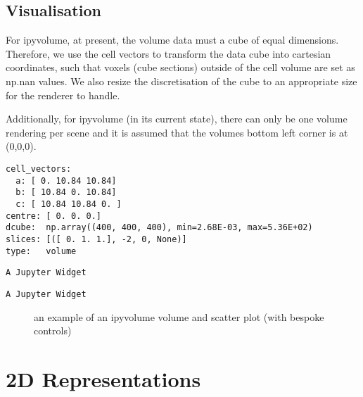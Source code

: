 \documentclass[10pt,parskip=half,
	toc=sectionentrywithdots,
	bibliography=totocnumbered,
	captions=tableheading,numbers=noendperiod]{scrartcl}
\begin{document}
\subsection{Visualisation}\label{visualisation}

For ipyvolume, at present, the volume data must a cube of equal
dimensions. Therefore, we use the cell vectors to transform the data
cube into cartesian coordinates, such that voxels (cube sections)
outside of the cell volume are set as np.nan values. We also resize the
discretisation of the cube to an appropriate size for the renderer to
handle.

Additionally, for ipyvolume (in its current state), there can only be
one volume rendering per scene and it is assumed that the volumes bottom
left corner is at (0,0,0).

\begin{lstlisting}[language={},postbreak={},numbers=none,xrightmargin=7pt,belowskip=5pt,aboveskip=5pt,breakindent=0pt]
cell_vectors: 
  a: [ 0. 10.84 10.84]
  b: [ 10.84 0. 10.84]
  c: [ 10.84 10.84 0. ]
centre: [ 0. 0. 0.]
dcube:  np.array((400, 400, 400), min=2.68E-03, max=5.36E+02)
slices: [([ 0. 1. 1.], -2, 0, None)]
type:   volume

\end{lstlisting}

\begin{lstlisting}[language={},postbreak={},numbers=none,xrightmargin=7pt,breakindent=0pt,aboveskip=5pt,belowskip=5pt]
A Jupyter Widget
\end{lstlisting}

\begin{lstlisting}[language={},postbreak={},numbers=none,xrightmargin=7pt,breakindent=0pt,aboveskip=5pt,belowskip=5pt]
A Jupyter Widget
\end{lstlisting}

\begin{figure}[H]\begin{center}\end{center}\caption{an example of an ipyvolume volume and scatter plot (with bespoke controls)}\label{fig:ipyvol3}
    \end{figure}

\section{2D Representations}\label{d-representations}
\end{document}
